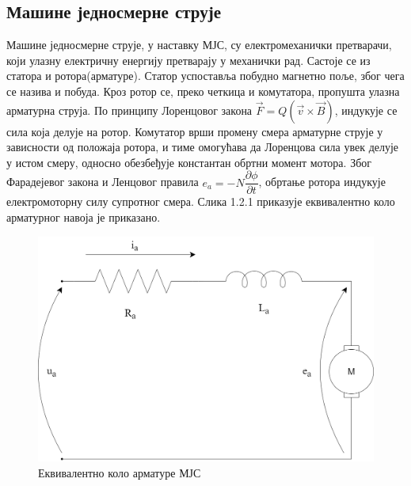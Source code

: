 \documentclass[12pt]{article}
\begin{document}
\subsection{Машине једносмерне струје}
Машине једносмерне струје, у наставку МЈС, су електромеханички претварачи, који улазну електричну енергију претварају у механички рад. Састоје се из статора и ротора(арматуре). Статор успоставља побудно магнетно поље, због чега се назива и побуда. Кроз ротор се, преко четкица и комутатора, пропушта улазна арматурна струја. По принципу Лоренцовог закона $\vec F=Q(\vec v \times \vec B)$, индукује се сила која делује на ротор. Комутатор врши промену смера арматурне струје у зависности од положаја ротора, и тиме омогућава да Лоренцова сила увек делује у истом смеру, односно обезбеђује константан обртни момент мотора. Због Фарадејевог закона и Ленцовог правила $e_a=-N\dfrac{\partial\phi }{\partial t}$, обртање ротора индукује електромоторну силу супротног смера. Слика 1.2.1 приказује еквивалентно коло арматурног навоја је приказано.

\begin{figure}[H]
    \centering
    \includegraphics[width=12cm]{figures/ekv_kolo_armatura.png}
    \caption{Еквивалентно коло арматуре МЈС}
    \label{fig:коло_арматуре}
\end{figure}
\end{document}
